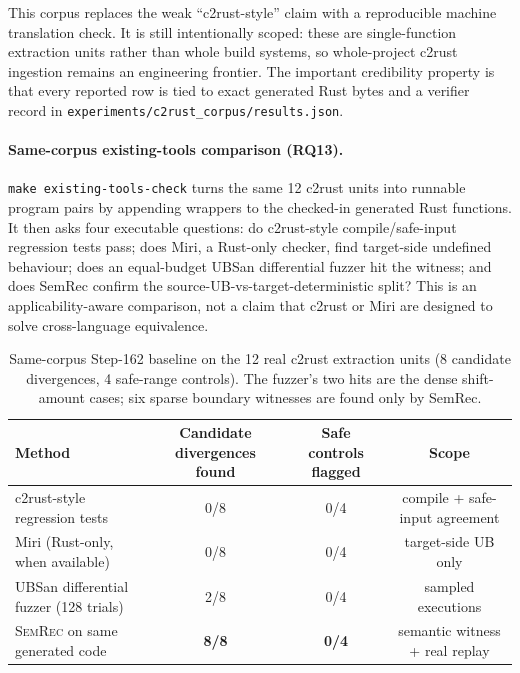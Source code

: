 \documentclass[10pt,a4paper]{article}
\begin{document}
This corpus replaces the weak ``c2rust-style'' claim with a reproducible machine
translation check. It is still intentionally scoped: these are single-function
extraction units rather than whole build systems, so whole-project c2rust
ingestion remains an engineering frontier. The important credibility property is
that every reported row is tied to exact generated Rust bytes and a verifier
record in \texttt{experiments/c2rust\_corpus/results.json}.

\paragraph{Same-corpus existing-tools comparison (RQ13).}
\texttt{make existing-tools-check} turns the same 12 c2rust units into runnable
program pairs by appending wrappers to the checked-in generated Rust functions.
It then asks four executable questions: do c2rust-style compile/safe-input
regression tests pass; does Miri, a Rust-only checker, find target-side undefined
behaviour; does an equal-budget UBSan differential fuzzer hit the witness; and
does SemRec confirm the source-UB-vs-target-deterministic split?  This is an
applicability-aware comparison, not a claim that c2rust or Miri are designed to
solve cross-language equivalence.

\begin{table}[t]
\centering
\small
\caption{Same-corpus Step-162 baseline on the 12 real c2rust extraction units
(8 candidate divergences, 4 safe-range controls).  The fuzzer's two hits are the
dense shift-amount cases; six sparse boundary witnesses are found only by SemRec.}
\label{tab:existing-tools}
\begin{tabular}{@{}lccc@{}}
\toprule
Method & Candidate divergences found & Safe controls flagged & Scope \\
\midrule
c2rust-style regression tests & 0/8 & 0/4 & compile + safe-input agreement \\
Miri (Rust-only, when available) & 0/8 & 0/4 & target-side UB only \\
UBSan differential fuzzer (128 trials) & 2/8 & 0/4 & sampled executions \\
\textsc{SemRec} on same generated code & \textbf{8/8} & \textbf{0/4} & semantic witness + real replay \\
\bottomrule
\end{tabular}
\end{table}
\end{document}
